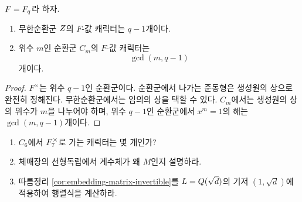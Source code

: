 \begin{proposition}
\label{prop:cyclic-character-count}
$F=F_q$라 하자.
\begin{enumerate}[label=(\roman*)]
  \item 무한순환군 $Z$의 $F$-값 캐릭터는 $q-1$개이다.
  \item 위수 $m$인 순환군 $C_m$의 $F$-값 캐릭터는
  \[
    \gcd(m,q-1)
  \]
  개이다.
\end{enumerate}
\end{proposition}

\begin{proof}
$F^\times$는 위수 $q-1$인 순환군이다. 순환군에서 나가는 준동형은
생성원의 상으로 완전히 정해진다. 무한순환군에서는 임의의 상을 택할 수 있다.
$C_m$에서는 생성원의 상의 위수가 $m$을 나누어야 하며,
위수 $q-1$인 순환군에서 $x^m=1$의 해는 $\gcd(m,q-1)$개이다.
\end{proof}

\begin{checkpoint}
\begin{enumerate}[label=(\alph*)]
  \item $C_6$에서 $F_7^\times$로 가는 캐릭터는 몇 개인가?
  \item 체매장의 선형독립에서 계수체가 왜 $M$인지 설명하라.
  \item 따름정리 \ref{cor:embedding-matrix-invertible}를
  $L=Q(\sqrt d)$의 기저 $(1,\sqrt d)$에 적용하여 행렬식을 계산하라.
\end{enumerate}
\end{checkpoint}
